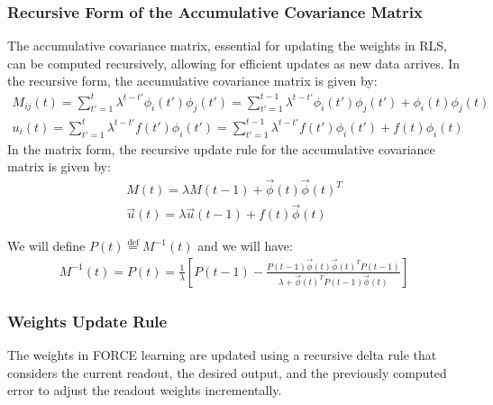 \documentclass[11pt]{book} %
\begin{document}
\subsubsection{Recursive Form of the Accumulative Covariance Matrix}
The accumulative covariance matrix, essential for updating the weights in RLS, can be computed recursively, allowing for efficient updates as new data arrives.
In the recursive form, the accumulative covariance matrix is given by:
\begin{align*}
    M_{ij}(t) = \sum_{t'=1}^t \lambda^{t-t'} \phi_i(t') \phi_j(t') =  \sum_{t'=1}^{t-1} \lambda^{t-t'} \phi_i(t') \phi_j(t') + \phi_i(t) \phi_j(t) \\
    {u_i}(t) = \sum _{t'=1}^t \lambda^{t-t'} f(t') \phi_i(t') = \sum _{t'=1}^{t-1} \lambda^{t-t'} f(t') \phi_i(t') + f(t) \phi_i(t)
\end{align*}
In the matrix form, the recursive update rule for the accumulative covariance matrix is given by:
\begin{align*}
    M(t) = \lambda M(t-1) + \vec{\phi}(t) \vec{\phi}(t)^T \\
    \vec{u}(t) = \lambda \vec{u}(t-1) + f(t) \vec{\phi}(t)
\end{align*}

We will define $P(t) \stackrel{\text{def}}{=} M^{-1}(t)$ and we will have:
\begin{align*}
    M^{-1}(t) =  P(t) = \frac{1}{\lambda} \left[ P(t-1) - \frac{P(t-1) \vec{\phi}(t) \vec{\phi}(t)^T P(t-1)}{\lambda + \vec{\phi}(t)^T P(t-1) \vec{\phi}(t)} \right]
\end{align*}

\subsubsection{Weights Update Rule}
The weights in FORCE learning are updated using a recursive delta rule that considers the current readout, the desired output, and the previously computed error to adjust the readout weights incrementally.
\end{document}
